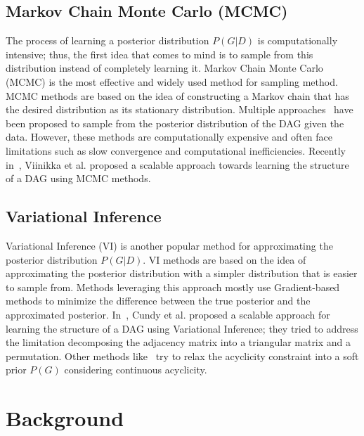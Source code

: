 \documentclass{lxaiproposal}
\begin{document}
    \subsection{Markov Chain Monte Carlo (MCMC)}
    \vspace*{-3mm}
    The process of learning a posterior distribution $P(G|D)$ is computationally intensive; thus, the first idea that
    comes to mind is to sample from this distribution instead of completely learning it. Markov Chain Monte Carlo (MCMC)
    is the most effective and widely used method for sampling method. MCMC methods are based on the idea of constructing
    a Markov chain that has the desired distribution as its stationary distribution. Multiple approaches~\cite{
        mcmc1, mcmc2, mcmc3} have been proposed to sample from the posterior distribution of the DAG given the data.
    However, these methods are computationally expensive and often face limitations such as slow convergence and
    computational inefficiencies. Recently in~\cite{viinikka2020scalablebayesianlearningcausal}, Viinikka et al. proposed a scalable approach towards
    learning the structure of a DAG using MCMC methods.

    \subsection{Variational Inference}
    \vspace*{-3mm}

    Variational Inference (VI) is another popular method for approximating the posterior distribution $P(G|D)$. VI
    methods are based on the idea of approximating the posterior distribution with a simpler distribution that is easier
    to sample from. Methods leveraging this approach mostly use Gradient-based methods to minimize the difference
    between the true posterior and the approximated posterior. In~\cite{cundy2021bcdnetsscalablevariational}, Cundy et al. proposed a scalable
    approach for learning the structure of a DAG using Variational Inference; they tried to address the limitation
    decomposing the adjacency matrix into a triangular matrix and a permutation. Other methods like~\cite{annadani2021variationalcausalnetworksapproximate, lorch2021dibsdifferentiablebayesianstructure}
    try to relax the acyclicity constraint into a soft prior $P(G)$ considering continuous acyclicity.


    \section{Background}\label{sec:background}
    \vspace*{-3mm}
\end{document}
